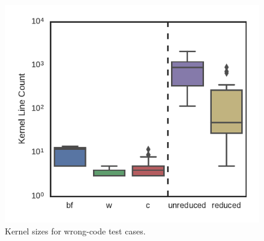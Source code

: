 \begin{figure}
  \centering %
    \includegraphics[width=\columnwidth]{build/img/kernel-sizes}%
  \caption{%
  	Kernel sizes for wrong-code test cases.%
  }%
  \label{fig:kernel-sizes} %
\end{figure}
